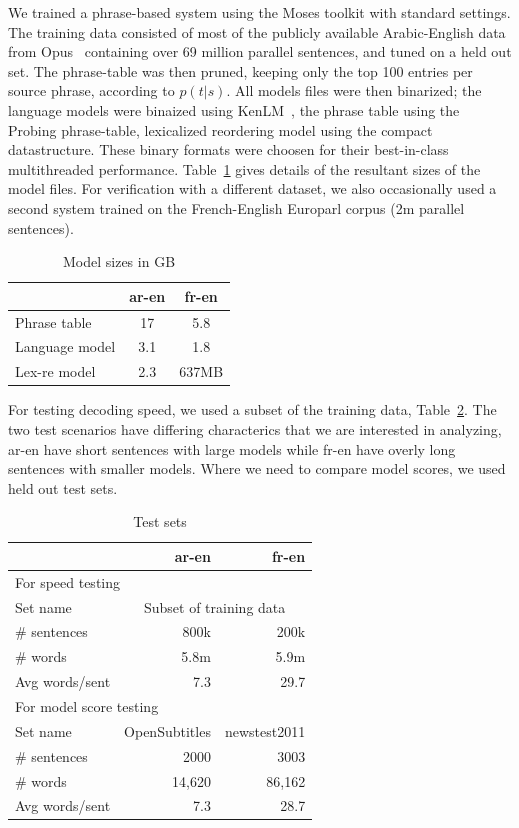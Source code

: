 \documentclass[11pt]{article}
\begin{document}
We trained a phrase-based system using the Moses toolkit with standard settings. The training data consisted of most of the publicly available Arabic-English data from Opus~\cite{tiedemann2012parallel} containing over 69 million parallel sentences, and tuned on a held out set. The phrase-table was then pruned, keeping only the top 100 entries per source phrase, according to $p(t|s)$. All models files were then binarized; the language models were binaized using KenLM~\cite{Heafield-kenlm}, the phrase table using the Probing phrase-table, lexicalized reordering model using the compact datastructure. These binary formats were choosen for their best-in-class multithreaded performance. Table~\ref{tab:model-files} gives details of the resultant sizes of the model files. For verification with a different dataset, we also occasionally used a second system trained on the French-English Europarl corpus (2m parallel sentences). 
\begin{table}[h]
\begin{center}
\begin{tabular}{|l|c|c|} \hline
		& ar-en	& fr-en \\ \hline
Phrase table  	& 17 	& 5.8 \\
Language model 	& 3.1  	& 1.8 \\ 
Lex-re model	& 2.3	& 637MB \\ \hline
\end{tabular}
\end{center}
\caption{Model sizes in GB}
\label{tab:model-files}
\end{table}
For testing decoding speed, we used a subset of the training data, Table~\ref{tab:test-sets}. The two test scenarios have differing characterics that we are interested in analyzing, ar-en have short sentences with large models while fr-en have overly long sentences with smaller models. Where we need to compare model scores, we used held out test sets.

\begin{table}[h]
\begin{center}
\small
\begin{tabular}{|l|r|r|} \hline
		& ar-en		& fr-en \\ \hline
\multicolumn{3}{|l|}{For speed testing} \\ \hline
Set name	& \multicolumn{2}{|c|}{Subset of training data} \\
\# sentences  	& 800k 		& 200k \\
\# words 	& 5.8m 		& 5.9m \\ 
Avg words/sent	& 7.3		& 29.7 \\ \hline
\multicolumn{3}{|l|}{For model score testing} \\ \hline
Set name	& OpenSubtitles	& newstest2011 \\
\# sentences  	& 2000 		& 3003 \\
\# words 	& 14,620 	& 86,162 \\ 
Avg words/sent	& 7.3		& 28.7 \\ \hline
\end{tabular}
\end{center}
\caption{Test sets}
\label{tab:test-sets}
\end{table}
\end{document}
